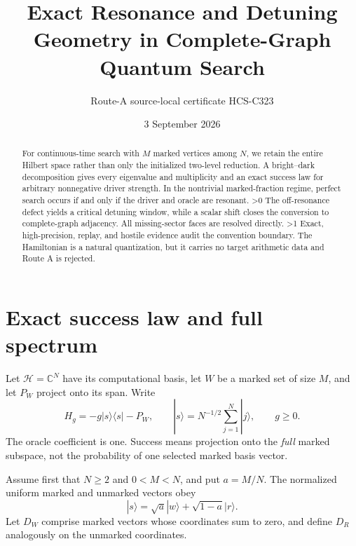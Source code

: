 \documentclass[10pt]{article}
\title{Exact Resonance and Detuning Geometry in Complete-Graph Quantum Search}
\author{Route-A source-local certificate HCS-C323}
\date{3 September 2026}
\providecommand{\CRevisionRound}{2}
\newcommand{\ket}[1]{|#1\rangle}
\newcommand{\bra}[1]{\langle#1|}
\begin{document}
\maketitle
\begin{abstract}
For continuous-time search with $M$ marked vertices among $N$, we retain the
entire Hilbert space rather than only the initialized two-level reduction.  A
bright--dark decomposition gives every eigenvalue and multiplicity and an
exact success law for arbitrary nonnegative driver strength.  In the
nontrivial marked-fraction regime, perfect search occurs if and only if the
driver and oracle are resonant.
\ifnum\CRevisionRound>0
The off-resonance defect yields a critical detuning window, while a scalar
shift closes the conversion to complete-graph adjacency.  All missing-sector
faces are resolved directly.
\fi
\ifnum\CRevisionRound>1
Exact, high-precision, replay, and hostile evidence audit the convention
boundary.  The Hamiltonian is a natural quantization, but it carries no
target arithmetic data and Route A is rejected.
\fi
\end{abstract}

\section{Exact success law and full spectrum}
Let $\mathcal H=\mathbb C^N$ have its computational basis, let $W$ be a
marked set of size $M$, and let $P_W$ project onto its span.  Write
\begin{equation}\label{eq:model}
 H_g=-g\ket{s}\bra{s}-P_W,\qquad
 \ket{s}=N^{-1/2}\sum_{j=1}^{N}\ket{j},\qquad g\geq0.
\end{equation}
The oracle coefficient is one.  Success means projection onto the \emph{full}
marked subspace, not the probability of one selected marked basis vector.

Assume first that $N\geq2$ and $0<M<N$, and put $a=M/N$.  The normalized
uniform marked and unmarked vectors obey
\begin{equation}\label{eq:brightstate}
 \ket{s}=\sqrt a\ket{w}+\sqrt{1-a}\ket{r}.
\end{equation}
Let $D_W$ comprise marked vectors whose coordinates sum to zero, and define
$D_R$ analogously on the unmarked coordinates.
\end{document}
